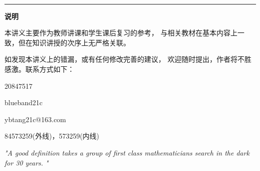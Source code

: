 






\answertrue
\hinttrue
\nottesttrue

\ifnottest
	\setcounter{tocdepth}{3}%
	\tableofcontents
\fi


\thispagestyle{empty}

\let\itemize\compactitem 
\let\enditemize\endcompactitem 
\let\enumerate\compactenum
\let\endenumerate\endcompactenum 
\let\description\compactdesc 
\let\enddescription\endcompactdesc
\setlength{\pltopsep}{0pt}
\setlength\abovedisplayskip{0pt}
\setlength\belowdisplayskip{0pt}

\ifnottest
	\bs\bs

	\hrule

	\bs\bs 
	{\bf 说明}

	{\kaishu 本讲义主要作为教师讲课和学生课后复习的参考，
	与相关教材在基本内容上一致，但在知识讲授的次序上无严格关联。}

	\bs

	{\kaishu 如发现本讲义上的错漏，或有任何修改完善的建议，
	欢迎随时提出，作者将不胜感激。联系方式如下：
	\begin{description}
		\setlength{\itemindent}{2cm}
		\item[QQ] 20847517
		\item[WeChat] blueband21c
		\item[email] ybtang21c@163.com
		\item[phone] 84573259(外线)，573259(内线) 
	\end{description}
	}

	\vfill
	{\color{gray}\it "A good definition takes a group of first class mathematicians search in the dark for 30 years. " }

	\newpage
\fi

%

\setcounter{page}{1}


